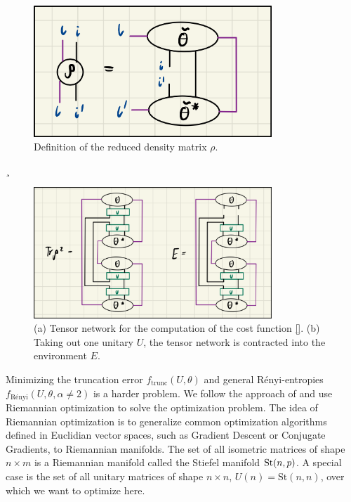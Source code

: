 \begin{figure}
	\centering
	\includegraphics[width=0.8\textwidth]{figures/disoTPS/disentangling_rho_definition.jpeg}
	\caption{Definition of the reduced density matrix $\rho$.}
	\label{fig:disentangling_rho_definition}
\end{figure}¸
\begin{figure}
	\centering
	\includegraphics[width=0.8\textwidth]{figures/disoTPS/disentangling_evenbly_vidal_algorithm.jpeg}
	\caption{(a) Tensor network for the computation of the cost function \eqref{}. (b) Taking out one unitary $U$, the tensor network is contracted into the environment $E$.}
	\label{fig:disentangling_evenbly_vidal_algorithm}
\end{figure}
Minimizing the truncation error $f_\text{trunc}\left(U,\theta\right)$ and general Rényi-entropies $f_\text{Rényi}\left(U,\theta,\alpha\neq2\right)$ is a harder problem. We follow the approach of \cite{cite:isometric_tensor_network_states_in_two_dimensions, cite:efficient_simulation_of_dynamics_in_two_dimensional_quantum_spin_systems} and use Riemannian optimization \cite{cite:optimization_on_matrix_manifolds, cite:riemannian_optimization_isometric_tensor_networks, cite:riemannian_geometry_automatic_differentiation_quantum_physics, cite:pymanopt} to solve the optimization problem. The idea of Riemannian optimization is to generalize common optimization algorithms defined in Euclidian vector spaces, such as Gradient Descent or Conjugate Gradients, to Riemannian manifolds. The set of all isometric matrices of shape $n\times m$ is a Riemannian manifold called the Stiefel manifold $\text{St}(n,p)$. A special case is the set of all unitary matrices of shape $n\times n$, $U(n)=\text{St}(n, n)$, over which we want to optimize here. \par
